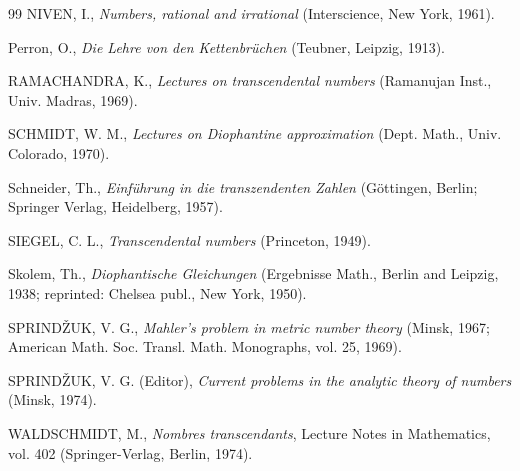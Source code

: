 \begin{thebibliography}{99}
	 NIVEN, I., \textit{Numbers, rational and irrational} (Interscience, New York, 1961).

	 Perron, O., \textit{Die Lehre von den Kettenbr{\"u}chen} (Teubner, Leipzig, 1913).

	 RAMACHANDRA, K., \textit{Lectures on transcendental numbers} (Ramanujan Inst., Univ. Madras, 1969).

	 SCHMIDT, W. M., \textit{Lectures on Diophantine approximation} (Dept. Math., Univ. Colorado, 1970).

	 Schneider, Th., \textit{Einf{\"u}hrung in die transzendenten Zahlen} (G{\"o}ttingen, Berlin; Springer Verlag, Heidelberg, 1957).

	 SIEGEL, C. L., \textit{Transcendental numbers} (Princeton, 1949).

	 Skolem, Th., \textit{Diophantische Gleichungen} (Ergebnisse Math., Berlin and Leipzig, 1938; reprinted: Chelsea publ., New York, 1950).

	 SPRIND{\v{Z}}UK, V. G., \textit{Mahler's problem in metric number theory} (Minsk, 1967; American Math. Soc. Transl. Math. Monographs, vol. 25, 1969).

	 SPRIND{\v{Z}}UK, V. G. (Editor), \textit{Current problems in the analytic theory of numbers} (Minsk, 1974).

	 WALDSCHMIDT, M., \textit{Nombres transcendants}, Lecture Notes in Mathematics, vol. 402 (Springer-Verlag, Berlin, 1974).

\end{thebibliography}
